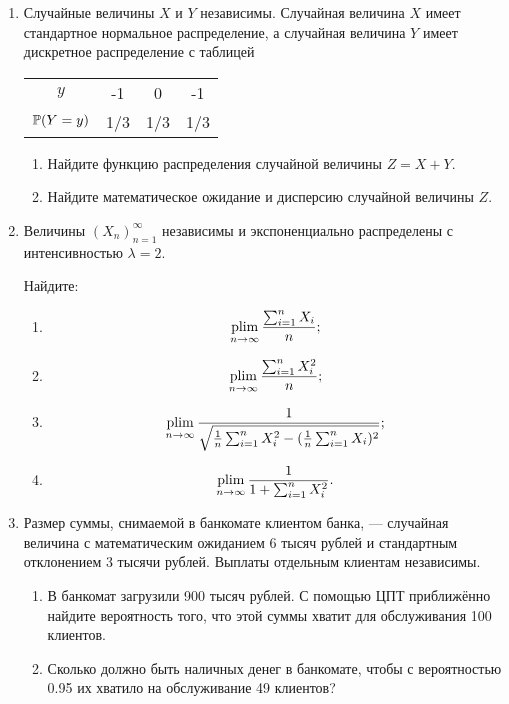\begin{enumerate}
  \item Случайные величины $X$ и $Y$ независимы. Случайная величина $X$ имеет стандартное нормальное распределение, 
  а случайная величина $Y$ имеет дискретное распределение с таблицей

  \begin{tabular}{cccc}
\toprule
$y$   & -1 & 0 & -1 \\
$\P(Y=y)$ & 1/3 & 1/3 & 1/3 \\
\bottomrule
\end{tabular}

\begin{enumerate}
    \item Найдите функцию распределения случайной величины $Z = X + Y$. 
    \item Найдите математическое ожидание и дисперсию случайной величины $Z$.
\end{enumerate}


\item Величины $(X_n)^{\infty}_{n=1}$ независимы и  экспоненциально распределены с интенсивностью $\lambda = 2$. 

Найдите:

\begin{enumerate}
	\item 
	\[
	\plim_{n\to\infty}  \frac{\sum_{i=1}^n X_i}{n};
	\]
	\item \[
	\plim_{n\to\infty}  \frac{\sum_{i=1}^n X_i^2}{n};
	\]
	\item \[
	\plim_{n\to\infty}  \frac{1}{\sqrt{\frac{1}{n} \sum_{i=1}^n X_i^2 - (\frac{1}{n} \sum_{i=1}^n X_i)^2}};
	\]
	\item \[
	\plim_{n\to\infty}  \frac{1}{1+\sum_{i=1}^n X_i^2}.
	\]
\end{enumerate}

\item Размер суммы, снимаемой в банкомате клиентом банка, — 
случайная величина с математическим ожиданием 6 тысяч рублей и стандартным отклонением 3 тысячи рублей. 
Выплаты отдельным клиентам независимы. 

\begin{enumerate}
    \item В банкомат загрузили 900 тысяч рублей. С помощью ЦПТ приближённо найдите вероятность того, 
    что этой суммы хватит для обслуживания 100 клиентов. 
    \item Сколько должно быть наличных денег в банкомате, чтобы с вероятностью 0.95 их хватило на обслуживание 49 клиентов?
\end{enumerate}


\end{enumerate}

